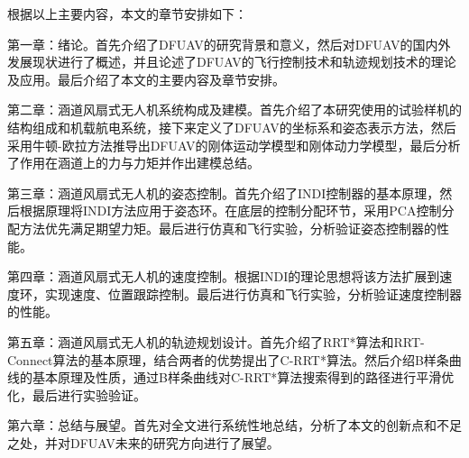 根据以上主要内容，本文的章节安排如下：

第一章：绪论。首先介绍了DFUAV的研究背景和意义，然后对DFUAV的国内外发展现状进行了概述，并且论述了DFUAV的飞行控制技术和轨迹规划技术的理论及应用。最后介绍了本文的主要内容及章节安排。

第二章：涵道风扇式无人机系统构成及建模。首先介绍了本研究使用的试验样机的结构组成和机载航电系统，接下来定义了DFUAV的坐标系和姿态表示方法，然后采用牛顿-欧拉方法推导出DFUAV的刚体运动学模型和刚体动力学模型，最后分析了作用在涵道上的力与力矩并作出建模总结。

第三章：涵道风扇式无人机的姿态控制。首先介绍了INDI控制器的基本原理，然后根据原理将INDI方法应用于姿态环。在底层的控制分配环节，采用PCA控制分配方法优先满足期望力矩。最后进行仿真和飞行实验，分析验证姿态控制器的性能。

第四章：涵道风扇式无人机的速度控制。根据INDI的理论思想将该方法扩展到速度环，实现速度、位置跟踪控制。最后进行仿真和飞行实验，分析验证速度控制器的性能。

第五章：涵道风扇式无人机的轨迹规划设计。首先介绍了RRT*算法和RRT-Connect算法的基本原理，结合两者的优势提出了C-RRT*算法。然后介绍B样条曲线的基本原理及性质，通过B样条曲线对C-RRT*算法搜索得到的路径进行平滑优化，最后进行实验验证。

第六章：总结与展望。首先对全文进行系统性地总结，分析了本文的创新点和不足之处，并对DFUAV未来的研究方向进行了展望。

